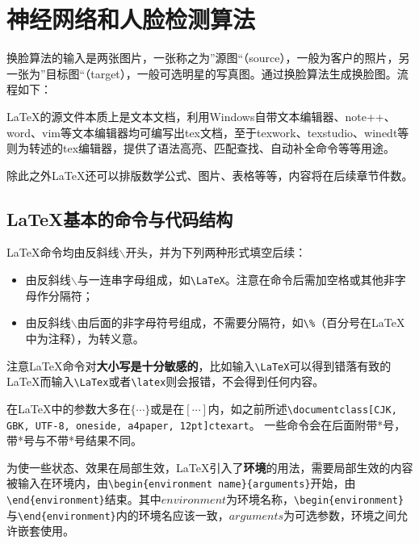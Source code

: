 \chapter{神经网络和人脸检测算法}
换脸算法的输入是两张图片，一张称之为”源图“（source），一般为客户的照片，另一张为”目标图“（target），一般可选明星的写真图。通过换脸算法生成换脸图。流程如下：

\LaTeX 的源文件本质上是文本文档，利用Windows自带文本编辑器、note++、word、vim等文本编辑器均可编写出tex文档，至于texwork、texstudio、winedt等则为转述的tex编辑器，提供了语法高亮、匹配查找、自动补全命令等等用途。

除此之外\LaTeX 还可以排版数学公式、图片、表格等等，内容将在后续章节件数。
\section{\LaTeX 基本的命令与代码结构}
\LaTeX 命令均由反斜线$\backslash$开头，并为下列两种形式填空后续：
\begin{itemize}
\item 由反斜线$\backslash$与一连串字母组成，如\verb|\LaTeX|。注意在命令后需加空格或其他非字母作分隔符；
\item 由反斜线$\backslash$由后面的非字母符号组成，不需要分隔符，如\verb|\%|（百分号在\LaTeX 中为注释），为转义意。
\end{itemize}

注意\LaTeX 命令对\textbf{大小写是十分敏感的}，比如输入\verb|\LaTeX|可以得到错落有致的\LaTeX 而输入\verb|\LaTex|或者\verb|\latex|则会报错，不会得到任何内容。

在\LaTeX 中的参数大多在$\{\cdots\}$或是在$[\cdots]$内，如之前所述\verb|\documentclass|\texttt{[CJK, GBK, UTF-8, oneside, a4paper, 12pt]{ctexart}}。
一些命令会在后面附带*号，带*号与不带*号结果不同。

为使一些状态、效果在局部生效，\LaTeX 引入了\textbf{环境}的用法，需要局部生效的内容被输入在环境内，由\verb|\begin{environment name}{arguments}|开始，由\verb|\end{environment}|结束。其中$environment$为环境名称，\verb|\begin{environment}|与\verb|\end{environment}|内的环境名应该一致，$arguments$为可选参数，环境之间允许嵌套使用。

